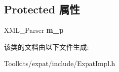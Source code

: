\subsection*{Protected 属性}
\begin{DoxyCompactItemize}
\item 
\hypertarget{class_c_expat_impl_a75803f8a4d4dc098f243dabbfba5de77}{X\+M\+L\+\_\+\+Parser {\bfseries m\+\_\+p}}\label{class_c_expat_impl_a75803f8a4d4dc098f243dabbfba5de77}

\end{DoxyCompactItemize}


该类的文档由以下文件生成\+:\begin{DoxyCompactItemize}
\item 
Toolkits/expat/include/Expat\+Impl.\+h\end{DoxyCompactItemize}
